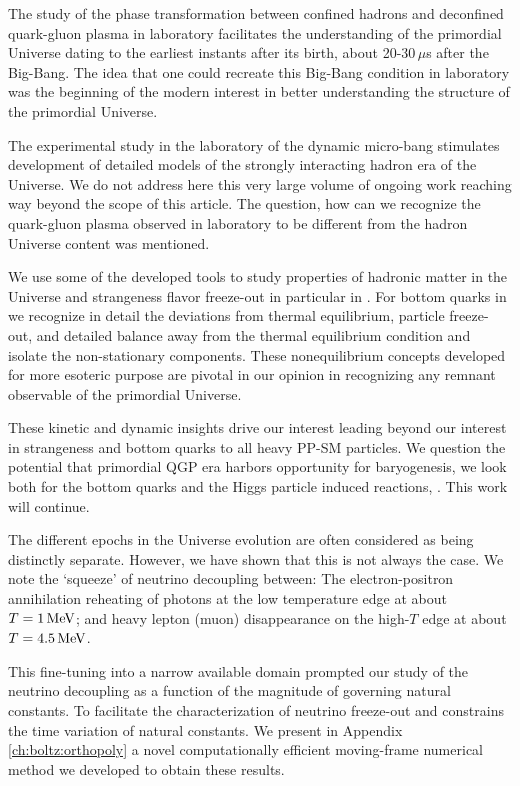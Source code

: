 The study of the phase transformation between confined hadrons and deconfined quark-gluon plasma in laboratory facilitates the understanding of the primordial Universe dating to the earliest instants after its birth, about 20-30\,$\mu$s after the Big-Bang. The idea that one could recreate this Big-Bang condition in laboratory was the beginning of the modern interest in better understanding the structure of the primordial Universe. 

The experimental study in the laboratory  of the dynamic micro-bang stimulates development of detailed models of the strongly interacting hadron era of the Universe. We do not address here this very large volume of ongoing work reaching way beyond the scope of this article. The question, how can we recognize the quark-gluon plasma observed in laboratory to be different from the hadron Universe content was mentioned. 

We use some of the developed tools to study properties of hadronic matter in the Universe and strangeness flavor freeze-out in particular in .  For bottom quarks in  we recognize in detail the deviations from thermal equilibrium, particle freeze-out, and detailed balance away from the thermal equilibrium condition and isolate the non-stationary components. These nonequilibrium concepts developed for more esoteric purpose are pivotal in our opinion in recognizing any remnant observable of the primordial Universe. 

These kinetic and dynamic insights drive our interest leading beyond our interest in strangeness and bottom quarks to all heavy PP-SM particles. We question the potential that primordial QGP era harbors opportunity  for baryogenesis, we look both for the bottom quarks and the Higgs particle induced reactions, . This work will continue.

The different epochs in the Universe evolution are often considered as being distinctly separate. However, we have shown that this is not always the case. We note the `squeeze' of neutrino decoupling between: The electron-positron annihilation reheating of photons at the low temperature edge at about $T=1\text{\,MeV}$; and heavy lepton (muon) disappearance on the high-$T$ edge at about $T=4.5\text{\,MeV}$. 

This fine-tuning into a narrow available domain prompted our study of the neutrino decoupling as a function of the magnitude of governing natural constants. To facilitate the characterization of neutrino freeze-out and constrains the time variation of natural constants. We present  in Appendix \ref{ch:boltz:orthopoly} a novel computationally efficient moving-frame numerical method we developed to obtain these results.

